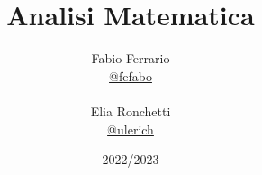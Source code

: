 \documentclass[12pt, a4paper, openany]{book}
\begin{document}
\title{Analisi Matematica}

\author{
	Fabio Ferrario\\
	\small{\href{https://t.me/fefabo}{@fefabo}}
	\\\\Elia Ronchetti\\
	\small{\href{https://t.me/ulerich}{@ulerich}}
}

\date{2022/2023}

\maketitle

\tableofcontents
















\end{document}
